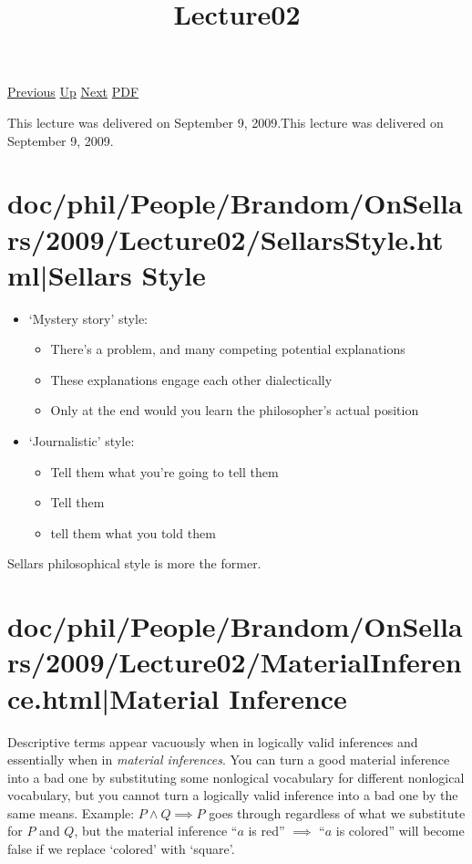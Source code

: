 \documentclass[12pt,a4paper]{report}
\begin{document}
 \href{doc/phil/People/Brandom/OnSellars/2009/Lecture01.html}{Previous} 
 \href{doc/phil/People/Brandom/OnSellars/2009.html}{Up} 
 \href{doc/phil/People/Brandom/OnSellars/2009/Lecture03.html}{Next} 
 \href{doc/phil/People/Brandom/OnSellars/2009/Lecture02.pdf}{PDF} 
\title{Lecture02}

\tableofcontents
This lecture was delivered on September 9, 2009.This lecture was delivered on September 9, 2009.

\part{doc/phil/People/Brandom/OnSellars/2009/Lecture02/SellarsStyle.html|Sellars Style}

\begin{itemize}
\item `Mystery story' style:
    \begin{itemize}
        \item There's a problem, and many competing potential explanations
        \item These explanations engage each other dialectically
        \item Only at the end would you learn the philosopher's actual position
    \end{itemize}
\item `Journalistic' style:
    \begin{itemize}
        \item Tell them what you're going to tell them
        \item Tell them
        \item tell them what you told them
    \end{itemize}
\end{itemize}

Sellars philosophical style is more the former.
\part{doc/phil/People/Brandom/OnSellars/2009/Lecture02/MaterialInference.html|Material Inference}

Descriptive terms appear vacuously when in logically valid inferences and essentially when in \emph{material inferences}. You can turn a good material inference into a bad one by substituting some nonlogical vocabulary for different nonlogical vocabulary, but you cannot turn a logically valid inference into a bad one by the same means. Example: $P \land Q \implies P$ goes through regardless of what we substitute for $P$ and $Q$, but the material inference ``$a$ is red'' $\implies$ ``$a$ is colored'' will become false if we replace `colored' with `square'.
\end{document}

